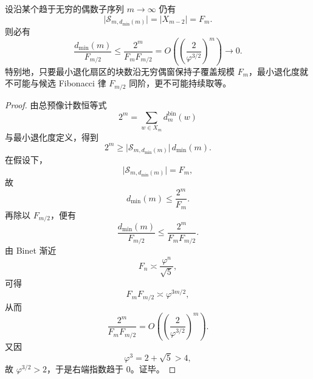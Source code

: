 \begin{theorem}\label{thm:conclusion-foldbin-subcover-exponential-mincollapse}
设沿某个趋于无穷的偶数子序列 \(m\to\infty\) 仍有
\[
\bigl|\mathcal S_{m,d_{\min}(m)}\bigr|
=
|X_{m-2}|
=
F_m.
\]
则必有
\[
\boxed{\;
\frac{d_{\min}(m)}{F_{m/2}}
\le
\frac{2^m}{F_mF_{m/2}}
=
O\!\left(\left(\frac{2}{\varphi^{3/2}}\right)^m\right)
\longrightarrow 0.\;}
\]
特别地，只要最小退化扇区的块数沿无穷偶窗保持子覆盖规模 \(F_m\)，最小退化度就不可能与候选 Fibonacci 律 \(F_{m/2}\) 同阶，更不可能持续取等。
\end{theorem}
\begin{proof}
由总预像计数恒等式
\[
2^m=\sum_{w\in X_m}d_m^{\mathrm{bin}}(w)
\]
与最小退化度定义，得到
\[
2^m\ge \bigl|\mathcal S_{m,d_{\min}(m)}\bigr|\,d_{\min}(m).
\]
在假设下，
\[
\bigl|\mathcal S_{m,d_{\min}(m)}\bigr|=F_m,
\]
故
\[
d_{\min}(m)\le \frac{2^m}{F_m}.
\]
再除以 \(F_{m/2}\)，便有
\[
\frac{d_{\min}(m)}{F_{m/2}}
\le
\frac{2^m}{F_mF_{m/2}}.
\]
由 Binet 渐近
\[
F_n\asymp \frac{\varphi^n}{\sqrt5},
\]
可得
\[
F_mF_{m/2}\asymp \varphi^{3m/2},
\]
从而
\[
\frac{2^m}{F_mF_{m/2}}
=
O\!\left(\left(\frac{2}{\varphi^{3/2}}\right)^m\right).
\]
又因
\[
\varphi^3=2+\sqrt5>4,
\]
故 \(\varphi^{3/2}>2\)，于是右端指数趋于 \(0\)。证毕。
\end{proof}

